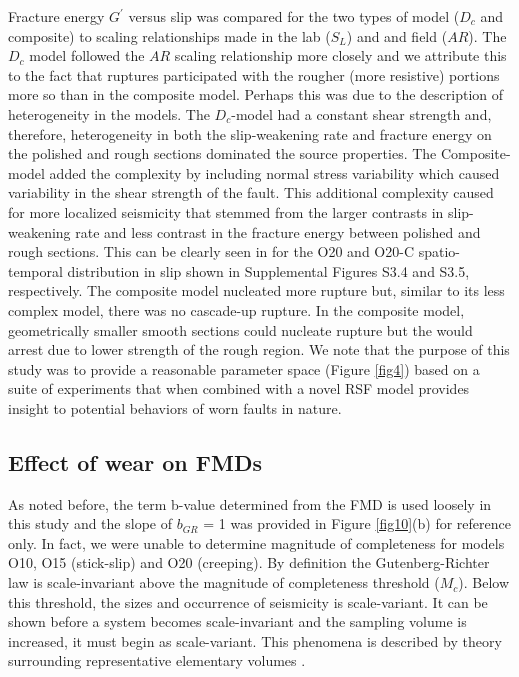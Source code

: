 \documentclass[preprint,1p, 10pt,authoryear]{elsarticle}
\begin{document}
Fracture energy $G^{'}$ versus slip was compared for the two types of model ($D_{c}$ and composite) to scaling relationships made in the lab ($S_{L}$) and and field ($AR$). The $D_{c}$ model followed the $AR$ scaling relationship more closely and we attribute this to the fact that ruptures participated with the rougher (more resistive) portions more so than in the composite model.  Perhaps this was due to the description of heterogeneity in the models. The $D_{c}$-model had a constant shear strength and, therefore, heterogeneity in both the slip-weakening rate and fracture energy on the polished and rough sections dominated the source properties. The Composite-model added the complexity by including normal stress variability which caused variability in the shear strength of the fault. This additional complexity caused for more localized seismicity that stemmed from the larger contrasts in slip-weakening rate and less contrast in the fracture energy between polished and rough sections. This can be clearly seen in for the O20 and O20-C spatio-temporal distribution in slip shown in Supplemental Figures S3.4 and S3.5, respectively.  The composite model nucleated more rupture but, similar to its less complex model, there was no cascade-up rupture.  In the composite model, geometrically smaller smooth sections could nucleate rupture but the would arrest due to lower strength of the rough region. We note that the purpose of this study was to provide a reasonable parameter space (Figure \ref{fig4}) based on a suite of experiments that when combined with a novel RSF model provides insight to potential behaviors of worn faults in nature.

\subsection{Effect of wear on FMDs}
As noted before, the term b-value determined from the FMD is used loosely in this study and the slope of $b_{GR}$ = 1 was provided in Figure \ref{fig10}(b) for reference only. In fact, we were unable to determine magnitude of completeness for models O10, O15 (stick-slip) and O20 (creeping). By definition the Gutenberg-Richter law is scale-invariant above the magnitude of completeness threshold ($M_{c}$). Below this threshold, the sizes and occurrence of seismicity is scale-variant. It can be shown before a system becomes scale-invariant and the sampling volume is increased, it must begin as scale-variant. This phenomena is described by theory surrounding representative elementary volumes \citep{Hill1963}.
\end{document}

